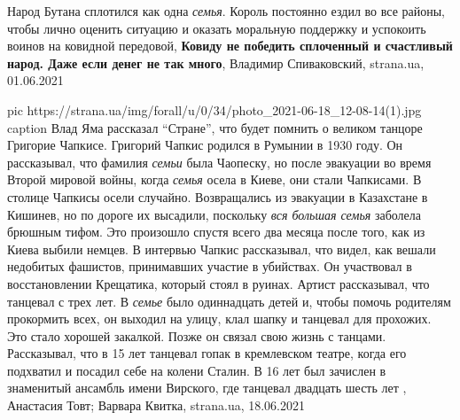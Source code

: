  
 
 
 
 
Народ Бутана сплотился как одна \emph{семья}. Король постоянно ездил во все районы,
чтобы лично оценить ситуацию и оказать моральную поддержку и успокоить воинов
на ковидной передовой, \textbf{Ковиду не победить сплоченный и счастливый
народ. Даже если денег не так много}, Владимир Спиваковский, strana.ua,
01.06.2021

\ifcmt
  pic https://strana.ua/img/forall/u/0/34/photo_2021-06-18_12-08-14(1).jpg
	caption Влад Яма рассказал \enquote{Стране}, что будет помнить о великом танцоре Григорие Чапкисе.
\fi
Григорий Чапкис родился в Румынии в 1930 году. Он рассказывал, что фамилия
\emph{семьи} была Чаопеску, но после эвакуации во время Второй мировой войны,
когда \emph{семья} осела в Киеве, они стали Чапкисами.  В столице Чапкисы осели
случайно.  Возвращались из эвакуации в Казахстане в Кишинев, но по дороге их
высадили, поскольку \emph{вся большая семья} заболела брюшным тифом. Это
произошло спустя всего два месяца после того, как из Киева выбили немцев. В
интервью Чапкис рассказывал, что видел, как вешали недобитых фашистов,
принимавших участие в убийствах. Он участвовал в восстановлении Крещатика,
который стоял в руинах.  Артист рассказывал, что танцевал с трех лет. В
\emph{семье} было одиннадцать детей и, чтобы помочь родителям прокормить всех,
он выходил на улицу, клал шапку и танцевал для прохожих. Это стало хорошей
закалкой.  Позже он связал свою жизнь с танцами. Рассказывал, что в 15 лет
танцевал гопак в кремлевском театре, когда его подхватил и посадил себе на
колени Сталин.  В 16 лет был зачислен в знаменитый ансамбль имени Вирского, где
танцевал двадцать шесть лет
, 
Анастасия Товт; Варвара Квитка, strana.ua, 18.06.2021

